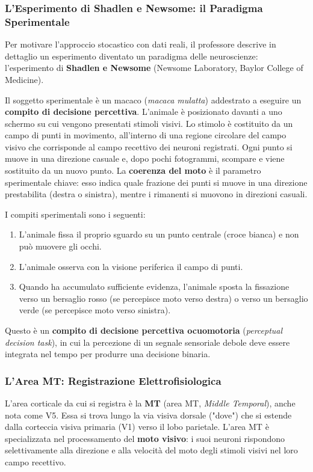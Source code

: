 \subsubsection{L'Esperimento di Shadlen e Newsome: il Paradigma Sperimentale}

Per motivare l'approccio stocastico con dati reali, il professore descrive in dettaglio un esperimento diventato un paradigma delle neuroscienze: l'esperimento di \textbf{Shadlen e Newsome} (Newsome Laboratory, Baylor College of Medicine).

Il soggetto sperimentale è un macaco (\textit{macaca mulatta}) addestrato a eseguire un \textbf{compito di decisione percettiva}. L'animale è posizionato davanti a uno schermo su cui vengono presentati stimoli visivi. Lo stimolo è costituito da un campo di punti in movimento, all'interno di una regione circolare del campo visivo che corrisponde al campo recettivo dei neuroni registrati. Ogni punto si muove in una direzione casuale e, dopo pochi fotogrammi, scompare e viene sostituito da un nuovo punto. La \textbf{coerenza del moto} è il parametro sperimentale chiave: esso indica quale frazione dei punti si muove in una direzione prestabilita (destra o sinistra), mentre i rimanenti si muovono in direzioni casuali.

I compiti sperimentali sono i seguenti:
\begin{enumerate}
    \item L'animale fissa il proprio sguardo su un punto centrale (croce bianca) e non può muovere gli occhi.
    \item L'animale osserva con la visione periferica il campo di punti.
    \item Quando ha accumulato sufficiente evidenza, l'animale sposta la fissazione verso un bersaglio rosso (se percepisce moto verso destra) o verso un bersaglio verde (se percepisce moto verso sinistra).
\end{enumerate}

Questo è un \textbf{compito di decisione percettiva ocuomotoria} (\textit{perceptual decision task}), in cui la percezione di un segnale sensoriale debole deve essere integrata nel tempo per produrre una decisione binaria.

\subsubsection{L'Area MT: Registrazione Elettrofisiologica}

L'area corticale da cui si registra è la \textbf{MT} (area MT, \textit{Middle Temporal}), anche nota come V5. Essa si trova lungo la via visiva dorsale ("dove") che si estende dalla corteccia visiva primaria (V1) verso il lobo parietale. L'area MT è specializzata nel processamento del \textbf{moto visivo}: i suoi neuroni rispondono selettivamente alla direzione e alla velocità del moto degli stimoli visivi nel loro campo recettivo.

